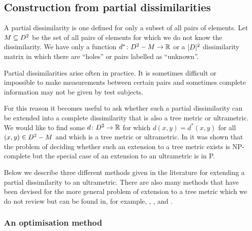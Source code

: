 \subsection{Construction from partial dissimilarities}
\label{sec:constr-from-part}

A partial dissimilarity is one defined for only a subset of all pairs of
elements.  Let $M \subseteq D^2$ be the set of all pairs of elements for
which we do not know the dissimilarity.  We have only a function $d^* \colon
D^2 - M \to {\mathbb R}$ or a $|D|^2$ dissimilarity matrix in which there are
``holes'' or pairs labelled as ``unknown''.

Partial dissimilarities arise often in practice.  It is sometimes difficult or
impossible to make measurements between certain pairs and sometimes complete
information may not be given by test subjects.

For this reason it becomes useful to ask whether such a partial dissimilarity
can be extended into a complete dissimilarity that is also a tree metric or
ultrametric.  We would like to find some $d \colon D^2 \to {\mathbb R}$ for which
$d(x,y) = d^*(x,y)$ for all $(x,y) \in D^2 - M$ and which is a tree metric
or ultrametric.  In \citep{farach1995robust} it was shown that the problem of
deciding whether such an extension to a tree metric exists is NP-complete but
the special case of an extension to an ultrametric is in P.

Below we describe three different methods given in the literature for
extending a partial dissimilarity to an ultrametric.  There are also many
methods that have been devised for the more general problem of extension to a
tree metric which we do not review but can be found in, for example,
\citep{guenoche1999approximations}, \citep{farach1995robust},
\citep{makarenkov2001nouvelle} and \citep{guenoche2004extension}.

\subsubsection{An optimisation method}
\label{sec:part-dist-optim-method}

